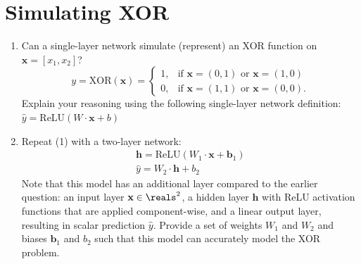 \section{Simulating XOR}
\begin{enumerate}
    \item Can a single-layer network simulate (represent) an XOR function on $\mathbf{x} = [x_1, x_2]$? 
    $$
    y = \text{XOR}(\mathbf{x}) = 
    \begin{cases}
        1, & \text{if } \mathbf{x} = (0, 1) \text{ or } \mathbf{x} = (1, 0) \\ 
        0, & \text{if } \mathbf{x} = (1, 1) \text{ or } \mathbf{x} = (0, 0).
    \end{cases}
    $$
    Explain your reasoning using the following single-layer network definition:  $\hat{y} = \text{ReLU}(W \cdot \mathbf{x} +b)$
    \item Repeat (1) with a two-layer network: 
    \begin{align*}
        \mathbf{h} = \text{ReLU}(W_1 \cdot \mathbf{x} +\mathbf{b}_1)\\ 
        \hat{y} = W_2 \cdot \mathbf{h} + b_2
    \end{align*}
    Note that this model has an additional layer compared to the earlier question: an input layer $\textbf{x}\in \reals^2$, a
    hidden layer $\textbf{h}$ with ReLU activation functions that are applied component-wise, and
    a linear output layer, resulting in scalar prediction $\hat{y}$. Provide a set of weights $W_1$ and $W_2$ and biases $\textbf{b}_1$ and $b_2$ such that this model can accurately model the XOR problem.
    \\
\end{enumerate}
